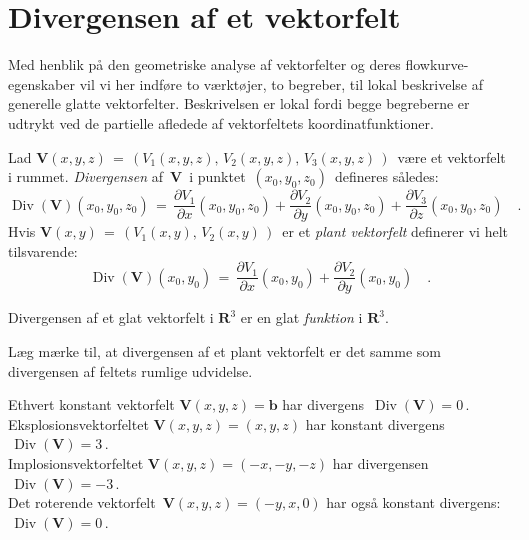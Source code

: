 \section{Divergensen af et vektorfelt} \label{secDiv}

Med henblik på den geometriske analyse af vektorfelter og deres flowkurve-egenskaber vil vi her indføre to værktøjer, to begreber,  til
lokal beskrivelse af generelle glatte vektorfelter. Beskrivelsen er lokal fordi begge begreberne er udtrykt ved de partielle afledede af vektorfeltets koordinatfunktioner.

\begin{definition}
Lad ${\mathbf{V}}(x,y,z) \,= \, (V_{1}(x,y,z), \, V_{2}(x,y,z), \,
V_{3}(x,y,z) \,)\,$ være et vektorfelt i rummet. {\em{{Divergensen}}}
af $\,{\mathbf{V}}\,$ i punktet $\,(x_{0},y_{0},z_{0})\,$ defineres
således:
\begin{equation}
\operatorname{Div}({\mathbf{V}})(x_{0},y_{0},z_{0}) \, = \,
\frac{\partial V_{1}}{\partial
x}(x_{0},y_{0},z_{0}) + \frac{\partial
V_{2}}{\partial y}(x_{0},y_{0},z_{0}) +
\frac{\partial V_{3}}{\partial
z}(x_{0},y_{0},z_{0}) \quad .
\end{equation}
Hvis ${\mathbf{V}}(x,y) \,= \, (V_{1}(x,y), \, V_{2}(x,y)\,)\,$  er et \emph{plant vektorfelt} definerer vi helt tilsvarende:
\begin{equation}
\operatorname{Div}({\mathbf{V}})(x_{0},y_{0}) \, = \,
\frac{\partial V_{1}}{\partial
x}(x_{0},y_{0}) + \frac{\partial
V_{2}}{\partial y}(x_{0},y_{0}) \quad .
\end{equation}
\end{definition}

\begin{think}
Divergensen af et glat vektorfelt i $\mathbf{R}^{3}$ er en glat \emph{funktion} i $\mathbf{R}^{3}$.
\end{think}

\begin{aha}
Læg mærke til, at divergensen af et plant vektorfelt er det samme som divergensen af feltets rumlige udvidelse.
\end{aha}


\begin{example} \label{exampDivExplode}
Ethvert konstant vektorfelt ${\mathbf{V}}(x,y,z) = \mathbf{b}$ har
divergens $\,\operatorname{Div}({\mathbf{V}}) = 0\,$. \\

Eksplosionsvektorfeltet ${\mathbf{V}}(x,y,z) = (x, y, z)$ har konstant
divergens $\,\operatorname{Div}({\mathbf{V}}) = 3\,$. \\

Implosionsvektorfeltet ${\mathbf{V}}(x,y,z) = (-x, -y, -z)$ har divergensen
 $\,\operatorname{Div}({\mathbf{V}}) = -3\,$. \\

 Det roterende vektorfelt
$\,{\mathbf{V}}(x,y,z) = (-y, x, 0)$ har også konstant divergens:
$\,\operatorname{Div}({\mathbf{V}}) = 0\,$.
\end{example}


